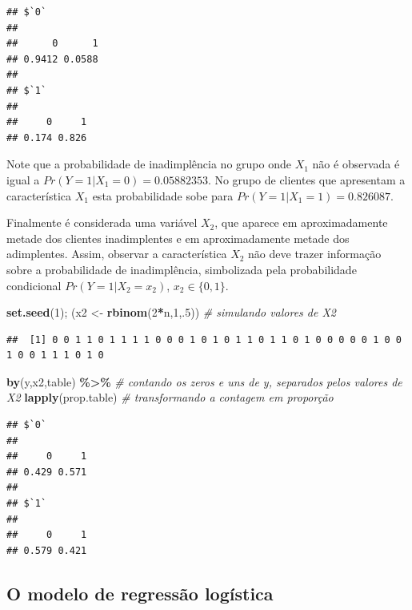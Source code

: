 \documentclass[
]{book}
\newenvironment{Shaded}{\begin{snugshade}}{\end{snugshade}}
\newcommand{\CommentTok}[1]{\textcolor[rgb]{0.56,0.35,0.01}{\textit{#1}}}
\newcommand{\DecValTok}[1]{\textcolor[rgb]{0.00,0.00,0.81}{#1}}
\newcommand{\KeywordTok}[1]{\textcolor[rgb]{0.13,0.29,0.53}{\textbf{#1}}}
\newcommand{\NormalTok}[1]{#1}
\newcommand{\OperatorTok}[1]{\textcolor[rgb]{0.81,0.36,0.00}{\textbf{#1}}}
\newcommand{\StringTok}[1]{\textcolor[rgb]{0.31,0.60,0.02}{#1}}
\theoremstyle{definition}
\theoremstyle{definition}
\theoremstyle{definition}
\theoremstyle{remark}
\begin{document}
\begin{verbatim}
## $`0`
## 
##      0      1 
## 0.9412 0.0588 
## 
## $`1`
## 
##     0     1 
## 0.174 0.826
\end{verbatim}

Note que a probabilidade de inadimplência no grupo onde \(X_1\) não é observada é igual a \(Pr(Y=1|X_1=0) = 0.05882353\). No grupo de clientes que apresentam a característica \(X_1\) esta probabilidade sobe para \(Pr(Y=1|X_1=1) = 0.826087\).

Finalmente é considerada uma variável \(X_2\), que aparece em aproximadamente metade dos clientes inadimplentes e em aproximadamente metade dos adimplentes. Assim, observar a característica \(X_2\) não deve trazer informação sobre a probabilidade de inadimplência, simbolizada pela probabilidade condicional \(Pr(Y=1|X_2 = x_2)\), \(x_2 \in \{0,1\}\).

\begin{Shaded}
\begin{Highlighting}[]
\KeywordTok{set.seed}\NormalTok{(}\DecValTok{1}\NormalTok{); (x2 \textless{}{-}}\StringTok{ }\KeywordTok{rbinom}\NormalTok{(}\DecValTok{2}\OperatorTok{*}\NormalTok{n,}\DecValTok{1}\NormalTok{,.}\DecValTok{5}\NormalTok{)) }\CommentTok{\# simulando valores de X2}
\end{Highlighting}
\end{Shaded}

\begin{verbatim}
##  [1] 0 0 1 1 0 1 1 1 1 0 0 0 1 0 1 0 1 1 0 1 1 0 1 0 0 0 0 0 1 0 0 1 0 0 1 1 1 0 1 0
\end{verbatim}

\begin{Shaded}
\begin{Highlighting}[]
\KeywordTok{by}\NormalTok{(y,x2,table) }\OperatorTok{\%\textgreater{}\%}\StringTok{  }\CommentTok{\# contando os zeros e uns de y, separados pelos valores de X2}
\StringTok{  }\KeywordTok{lapply}\NormalTok{(prop.table) }\CommentTok{\# transformando a contagem em proporção}
\end{Highlighting}
\end{Shaded}

\begin{verbatim}
## $`0`
## 
##     0     1 
## 0.429 0.571 
## 
## $`1`
## 
##     0     1 
## 0.579 0.421
\end{verbatim}

\hypertarget{o-modelo-de-regressuxe3o-loguxedstica}{%
\subsection{O modelo de regressão logística}\label{o-modelo-de-regressuxe3o-loguxedstica}}
\end{document}
